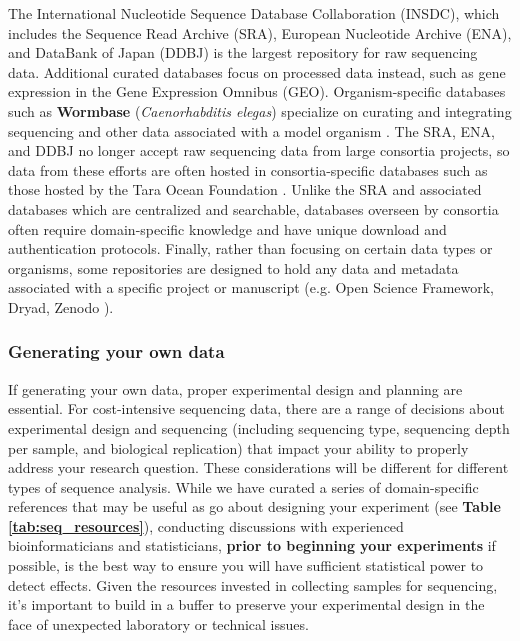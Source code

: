 \documentclass[10pt,letterpaper]{article}
\begin{document}
The International Nucleotide Sequence Database Collaboration (INSDC), which includes the Sequence Read Archive (SRA), European Nucleotide Archive (ENA), and DataBank of Japan (DDBJ) is the largest repository for raw sequencing data. 
Additional curated databases focus on processed data instead, such as gene expression in the Gene Expression Omnibus (GEO).  
Organism-specific databases such as \textbf{Wormbase} (\textit{Caenorhabditis elegas}) specialize on curating and integrating sequencing and other data associated with a model organism \cite{harris2020wormbase}. 
The SRA, ENA, and DDBJ no longer accept raw sequencing data from large consortia projects, so data from these efforts are often hosted in consortia-specific databases such as those hosted by the Tara Ocean Foundation \cite{pesant2015open}.
Unlike the SRA and associated databases which are centralized and searchable, databases overseen by consortia often require domain-specific knowledge and have unique download and authentication protocols.
Finally, rather than focusing on certain data types or organisms, some repositories are designed to hold any data and metadata associated with a specific project or manuscript (e.g. Open Science Framework, Dryad, Zenodo \cite{foster2017open}).


\subsubsection*{Generating your own data}
If generating your own data, proper experimental design and planning are essential. 
For cost-intensive sequencing data, there are a range of decisions about experimental design and sequencing (including sequencing type, sequencing depth per sample, and biological replication) that impact your ability to properly address your research question. 
These considerations will be different for different types of sequence analysis. 
While we have curated a series of domain-specific references that may be useful as go about designing your experiment (see \textbf{Table \ref{tab:seq_resources}}), conducting discussions with experienced bioinformaticians and statisticians, \textbf{prior to beginning your experiments} if possible, is the best way to ensure you will have sufficient statistical power to detect effects.
Given the resources invested in collecting samples for sequencing, it's important to build in a buffer to preserve your experimental design in the face of unexpected laboratory or technical issues. 
\end{document}

